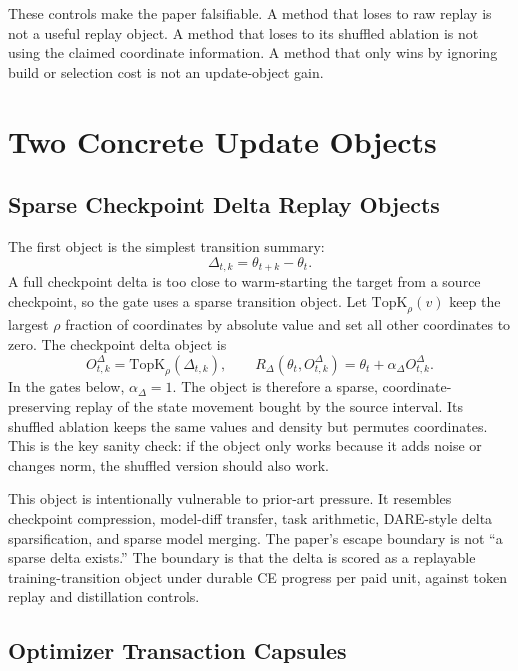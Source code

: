\documentclass{article}
\begin{document}
These controls make the paper falsifiable. A method that loses to raw replay is
not a useful replay object. A method that loses to its shuffled ablation is not
using the claimed coordinate information. A method that only wins by ignoring
build or selection cost is not an update-object gain.

\section{Two Concrete Update Objects}

\subsection{Sparse Checkpoint Delta Replay Objects}

The first object is the simplest transition summary:
\begin{equation}
  \Delta_{t,k} = \theta_{t+k} - \theta_t.
\end{equation}
A full checkpoint delta is too close to warm-starting the target from a source
checkpoint, so the gate uses a sparse transition object. Let
$\mathrm{TopK}_\rho(v)$ keep the largest $\rho$ fraction of coordinates by
absolute value and set all other coordinates to zero. The checkpoint delta
object is
\begin{equation}
  O^{\Delta}_{t,k} = \mathrm{TopK}_\rho(\Delta_{t,k}),
  \qquad
  R_{\Delta}(\theta_t,O^{\Delta}_{t,k}) =
  \theta_t + \alpha_{\Delta} O^{\Delta}_{t,k}.
  \label{eq:checkpoint_delta_object}
\end{equation}
In the gates below, $\alpha_{\Delta}=1$. The object is therefore a sparse,
coordinate-preserving replay of the state movement bought by the source
interval. Its shuffled ablation keeps the same values and density but permutes
coordinates. This is the key sanity check: if the object only works because it
adds noise or changes norm, the shuffled version should also work.

This object is intentionally vulnerable to prior-art pressure. It resembles
checkpoint compression, model-diff transfer, task arithmetic, DARE-style delta
sparsification, and sparse model merging. The paper's escape boundary is not
``a sparse delta exists.'' The boundary is that the delta is scored as a
replayable training-transition object under durable CE progress per paid unit,
against token replay and distillation controls.

\subsection{Optimizer Transaction Capsules}
\end{document}
